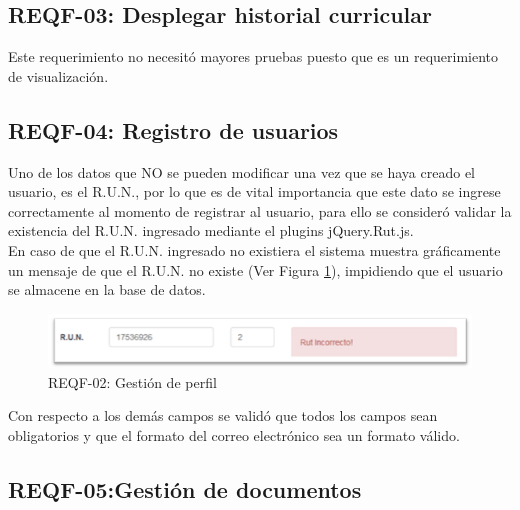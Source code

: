 \subsection{REQF-03: Desplegar historial curricular}

Este requerimiento no necesitó mayores pruebas puesto que es un requerimiento de visualización.

\subsection{REQF-04: Registro de usuarios}

Uno de los datos que NO se pueden modificar una vez que se haya creado el usuario, es el R.U.N., por lo que es de vital importancia que este dato se ingrese correctamente al momento de registrar al usuario, para ello se consideró validar la existencia del R.U.N. ingresado mediante el plugins jQuery.Rut.js. \\

En caso de que el R.U.N. ingresado no existiera el sistema muestra gráficamente un mensaje de que el R.U.N. no existe (Ver Figura \ref{REQF-02-rut}), impidiendo que el usuario se almacene en la base de datos.

\begin{figure}[H]
	\centering
	\includegraphics[width=1\textwidth]{images/Capitulo_5/REQF-02-rut.png}
	\caption[REQF-02: Gestión de perfil]{REQF-02: Gestión de perfil}
	\label{REQF-02-rut}
\end{figure}

Con respecto a los demás campos se validó que todos los campos sean obligatorios y que el formato del correo electrónico sea un formato  válido.


\subsection{REQF-05:Gestión de documentos}

